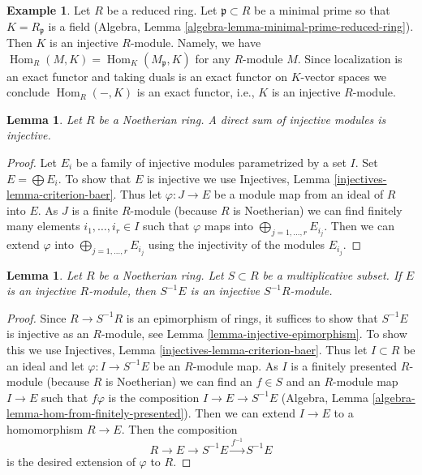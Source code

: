 \documentclass{stacks-project}
\theoremstyle{plain}
\newtheorem{lemma}[subsection]{Lemma}
\theoremstyle{definition}
\newtheorem{example}[subsection]{Example}
\theoremstyle{remark}
\numberwithin{equation}{subsection}
\def\Hom{\mathop{\mathrm{Hom}}\nolimits}
\begin{document}
\begin{example}
\label{example-reduced-ring-injective}
Let $R$ be a reduced ring. Let $\mathfrak p \subset R$ be a minimal prime
so that $K = R_\mathfrak p$ is a field
(Algebra, Lemma \ref{algebra-lemma-minimal-prime-reduced-ring}).
Then $K$ is an injective $R$-module. Namely, we have
$\Hom_R(M, K) = \Hom_K(M_\mathfrak p, K)$ for any $R$-module
$M$. Since localization is an exact functor and taking duals is
an exact functor on $K$-vector spaces we conclude $\Hom_R(-, K)$
is an exact functor, i.e., $K$ is an injective $R$-module.
\end{example}

\begin{lemma}
\label{lemma-sum-injective-modules}
Let $R$ be a Noetherian ring. A direct sum of injective modules
is injective.
\end{lemma}

\begin{proof}
Let $E_i$ be a family of injective modules parametrized by a set $I$.
Set $E = \bigoplus E_i$. To show that $E$ is injective we use
Injectives, Lemma \ref{injectives-lemma-criterion-baer}.
Thus let $\varphi : J \to E$ be a module map from an ideal of $R$
into $E$. As $J$ is a finite $R$-module (because $R$ is Noetherian)
we can find finitely many elements $i_1, \ldots, i_r \in I$
such that $\varphi$ maps into $\bigoplus_{j = 1, \ldots, r} E_{i_j}$.
Then we can extend $\varphi$ into $\bigoplus_{j = 1, \ldots, r} E_{i_j}$
using the injectivity of the modules $E_{i_j}$.
\end{proof}

\begin{lemma}
\label{lemma-localization-injective-modules}
Let $R$ be a Noetherian ring. Let $S \subset R$ be a multiplicative
subset. If $E$ is an injective $R$-module, then $S^{-1}E$ is an
injective $S^{-1}R$-module.
\end{lemma}

\begin{proof}
Since $R \to S^{-1}R$ is an epimorphism of rings, it suffices
to show that $S^{-1}E$ is injective as an $R$-module, see
Lemma \ref{lemma-injective-epimorphism}.
To show this we use Injectives, Lemma \ref{injectives-lemma-criterion-baer}.
Thus let $I \subset R$ be an ideal and let
$\varphi : I \to S^{-1} E$ be an $R$-module map.
As $I$ is a finitely presented $R$-module (because $R$ is Noetherian)
we can find an $f \in S$ and an $R$-module map $I \to E$
such that $f\varphi$ is the composition $I \to E \to S^{-1}E$
(Algebra, Lemma \ref{algebra-lemma-hom-from-finitely-presented}).
Then we can extend $I \to E$ to a homomorphism $R \to E$.
Then the composition
$$
R \to E \to S^{-1}E \xrightarrow{f^{-1}} S^{-1}E
$$
is the desired extension of $\varphi$ to $R$.
\end{proof}
\end{document}
